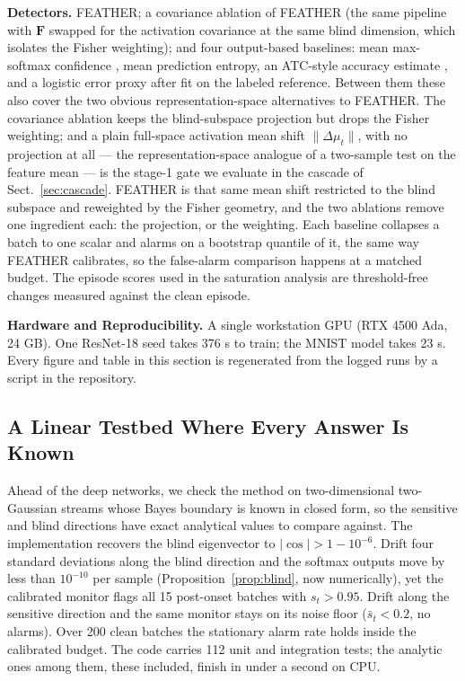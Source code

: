 \documentclass[acmsmall,screen]{acmart}
\newcommand{\runinhead}[1]{\par\smallskip\noindent\textbf{#1}\quad\ignorespaces}
\theoremstyle{acmdefinition}
\newcommand{\F}{\mathbf{F}}
\begin{document}
\runinhead{Detectors.}
FEATHER; a covariance ablation of FEATHER (the same pipeline with $\F$
swapped for the activation covariance at the same blind dimension, which
isolates the Fisher weighting); and four output-based baselines: mean
max-softmax confidence \cite{hendrycks2017baseline}, mean prediction entropy,
an ATC-style accuracy estimate \cite{garg2022atc}, and a logistic error proxy
after \cite{amoukou2024sequential} fit on the labeled reference. Between them
these also cover the two obvious representation-space alternatives to FEATHER.
The covariance ablation keeps the blind-subspace projection but drops the Fisher
weighting; and a plain full-space activation mean shift
$\lVert\Delta\mu_t\rVert$, with no projection at all --- the representation-space
analogue of a two-sample test on the feature mean --- is the stage-1 gate we
evaluate in the cascade of Sect.~\ref{sec:cascade}. FEATHER is that same mean
shift restricted to the blind subspace and reweighted by the Fisher geometry,
and the two ablations remove one ingredient each: the projection, or the
weighting. Each baseline collapses a batch to one scalar and alarms on a
bootstrap quantile of it, the same way FEATHER calibrates, so the false-alarm
comparison happens at a matched budget. The episode scores used in the saturation analysis are
threshold-free changes measured against the clean episode.

\runinhead{Hardware and Reproducibility.}
A single workstation GPU (RTX 4500 Ada, 24 GB). One ResNet-18 seed takes
376 s to train; the MNIST model takes 23 s. Every figure and table in this
section is regenerated from the logged runs by a script in the repository.

\subsection{A Linear Testbed Where Every Answer Is Known}

Ahead of the deep networks, we check the method on two-dimensional
two-Gaussian streams whose Bayes boundary is known in closed form, so the
sensitive and blind directions have exact analytical values to compare
against. The implementation recovers the blind eigenvector to
$|\cos| > 1 - 10^{-6}$. Drift four standard deviations along the blind
direction and the softmax outputs move by less than $10^{-10}$ per sample
(Proposition~\ref{prop:blind}, now numerically), yet the calibrated monitor
flags all 15 post-onset batches with $s_t > 0.95$. Drift along the sensitive
direction and the same monitor stays on its noise floor ($\bar{s}_t < 0.2$,
no alarms). Over 200 clean batches the stationary alarm rate holds inside the
calibrated budget. The code carries 112 unit and integration tests; the
analytic ones among them, these included, finish in under a second on CPU.
\end{document}
